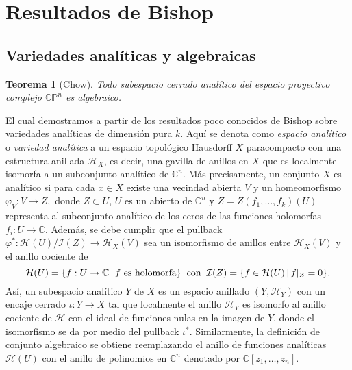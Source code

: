 \documentclass{article}
\newtheorem{teorema}{Teorema}[section]
\newcommand{\co}{\ensuremath{\mathbb C }}
\newcommand{\con}{\ensuremath{\mathbb{C}^n}}
\newcommand{\cp}{\ensuremath{\mathbb{CP}}}
\begin{document}
\section{Resultados de Bishop}
\subsection{Variedades anal\'iticas y algebraicas}
\begin{teorema}[Chow]\label{Chow}
        Todo subespacio cerrado anal\'itico del espacio proyectivo complejo $\cp^{n}$ es algebraico.
\end{teorema}
\noindent El cual demostramos a partir de los resultados poco conocidos de Bishop sobre variedades anal\'iticas de dimensi\'on pura $k$. Aqu\'i se denota como \emph{espacio
anal\'itico} o \emph{variedad anal\'itica} a un espacio topol\'ogico Hausdorff $X$ paracompacto con una estructura anillada $\mathcal{H}_X$, es decir, una 
gavilla de anillos en $X$ que es localmente isomorfa a un subconjunto anal\'itico de $\con$. M\'as precisamente, un conjunto $X$ es anal\'itico 
si para cada $x\in X$ existe una vecindad abierta $V$ y un homeomorfismo $\varphi_V:V\rightarrow Z,$ donde $Z\subset U$, $U$ es un abierto
de $\con$ y $Z=Z(f_1,\dots,f_k)(U)$
representa al subconjunto anal\'itico de los ceros de las funciones holomorfas $f_i:U\rightarrow\co$. Adem\'as, se debe cumplir que el pullback $\varphi^{*}:\mathcal{H}(U)/\mathcal{I}(Z)\rightarrow \mathcal{H}_X(V)$ 
sea un isomorfismo de anillos entre $\mathcal{H}_X(V)$ y el anillo cociente de
\[
        \mathcal{H}(U)=\{f:U\rightarrow\co\,|\,f \text{ es holomorfa}\}\hspace{0.2cm}\text{con}\hspace{0.2cm}\mathcal{I}(Z)=\{f\in\mathcal{H}(U)\,|\,f|_{Z}=0\}.
\]
As\'i, un subespacio anal\'itico $Y$ de $X$ es un espacio anillado $(Y,\mathcal{H}_Y)$ con un encaje cerrado $\iota:Y\rightarrow X$ tal que localmente el anillo
$\mathcal{H}_Y$ es isomorfo al anillo cociente de $\mathcal{H}$ con el ideal de funciones nulas en la imagen de $Y$, donde el isomorfismo se da por medio del 
pullback $\iota^{*}$. Similarmente, la definici\'on de conjunto algebraico se obtiene reemplazando el anillo de funciones anal\'iticas $\mathcal{H}(U)$ con el anillo de 
polinomios en $\con$ denotado por $\co[z_1,\dots,z_n]$.
\end{document}
